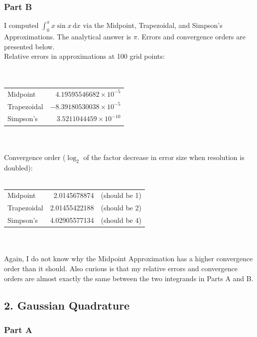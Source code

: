 \documentclass{article}
\newcommand{\inte}[4]{\int_{#1}^{#2} \! #3 \, \mathrm{d} #4}
\newcommand{\ee}[1]{\times 10^{#1}}
\begin{document}
\begin{spacing}{1.1}
\subsubsection{Part B}

I computed \(\inte{0}{\pi}{x \sin x}{x}\) via the Midpoint, Trapezoidal, and Simpson's Approximations. The analytical answer is \(\pi\). Errors and convergence orders are presented below. \\

\noindent Relative errors in approximations at 100 grid points: \\ \\
    \begin{tabular}{lr}
	Midpoint & \(4.19595546682\ee{-5}\) \\
	Trapezoidal &	 \(-8.39180530038\ee{-5} \)\\
	Simpson's &	 \(3.5211044459\ee{-10}\)\\

	\end{tabular} \\ \\

\noindent Convergence order (\(\log_2\) of the factor decrease in error size when resolution is doubled): \\ \\
\begin{tabular}{lrr}
Midpoint 	& 2.0145678874 & (should be 1) \\
Trapezoidal &	 2.01455422188 & (should be 2) \\
Simpson's 	& 4.02905577134 & (should be 4) \\
\end{tabular} \\ \\

Again, I do not know why the Midpoint Approximation has a higher convergence order than it should. Also curious is that my relative errors and convergence orders are almost exactly the same between the two integrands in Parts A and B.

\newpage
\subsection{2. Gaussian Quadrature}

\subsubsection{Part A}


\end{spacing}
\end{document}
